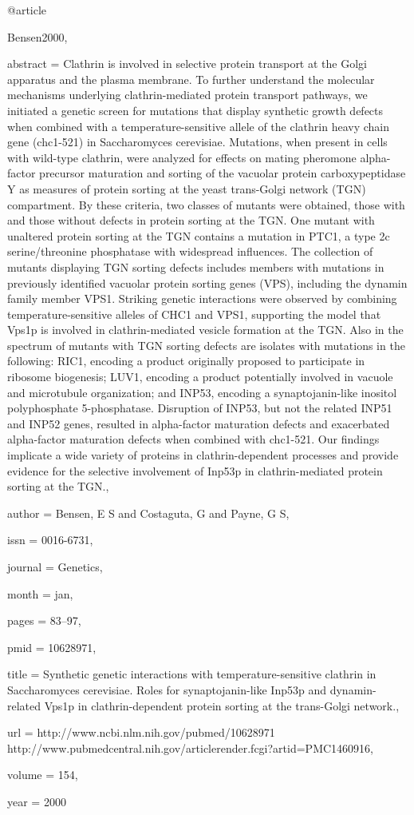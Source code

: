 @article{Bensen2000,

abstract = {Clathrin is involved in selective protein transport at the Golgi apparatus and the plasma membrane. To further understand the molecular mechanisms underlying clathrin-mediated protein transport pathways, we initiated a genetic screen for mutations that display synthetic growth defects when combined with a temperature-sensitive allele of the clathrin heavy chain gene (chc1-521) in Saccharomyces cerevisiae. Mutations, when present in cells with wild-type clathrin, were analyzed for effects on mating pheromone alpha-factor precursor maturation and sorting of the vacuolar protein carboxypeptidase Y as measures of protein sorting at the yeast trans-Golgi network (TGN) compartment. By these criteria, two classes of mutants were obtained, those with and those without defects in protein sorting at the TGN. One mutant with unaltered protein sorting at the TGN contains a mutation in PTC1, a type 2c serine/threonine phosphatase with widespread influences. The collection of mutants displaying TGN sorting defects includes members with mutations in previously identified vacuolar protein sorting genes (VPS), including the dynamin family member VPS1. Striking genetic interactions were observed by combining temperature-sensitive alleles of CHC1 and VPS1, supporting the model that Vps1p is involved in clathrin-mediated vesicle formation at the TGN. Also in the spectrum of mutants with TGN sorting defects are isolates with mutations in the following: RIC1, encoding a product originally proposed to participate in ribosome biogenesis; LUV1, encoding a product potentially involved in vacuole and microtubule organization; and INP53, encoding a synaptojanin-like inositol polyphosphate 5-phosphatase. Disruption of INP53, but not the related INP51 and INP52 genes, resulted in alpha-factor maturation defects and exacerbated alpha-factor maturation defects when combined with chc1-521. Our findings implicate a wide variety of proteins in clathrin-dependent processes and provide evidence for the selective involvement of Inp53p in clathrin-mediated protein sorting at the TGN.},

author = {Bensen, E S and Costaguta, G and Payne, G S},

issn = {0016-6731},

journal = {Genetics},

month = {jan},

pages = {83--97},

pmid = {10628971},

title = {{Synthetic genetic interactions with temperature-sensitive clathrin in Saccharomyces cerevisiae. Roles for synaptojanin-like Inp53p and dynamin-related Vps1p in clathrin-dependent protein sorting at the trans-Golgi network.}},

url = {http://www.ncbi.nlm.nih.gov/pubmed/10628971 http://www.pubmedcentral.nih.gov/articlerender.fcgi?artid=PMC1460916},

volume = {154},

year = {2000}

}


